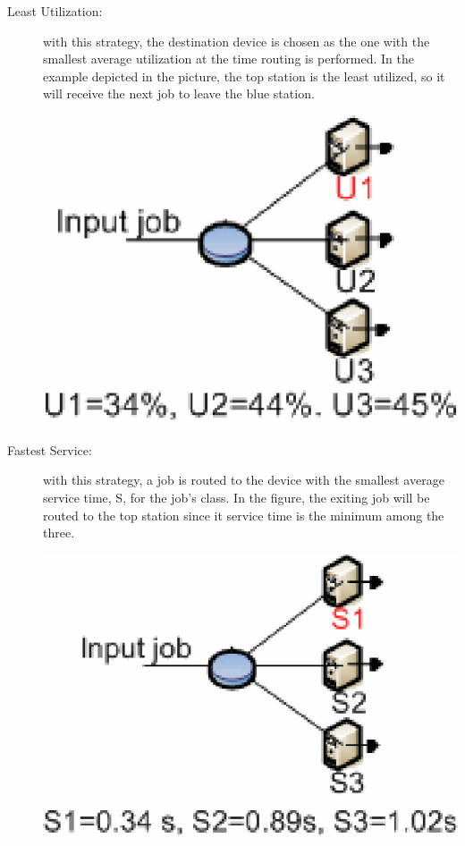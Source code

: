 \begin{description}
\begin{center}
\end{center}
\item[Least Utilization:] with this strategy, the destination device is chosen as the one with the smallest average utilization at the time routing is performed. In the example depicted in the picture, the top station is the least utilized, so it will receive the next job to leave the blue station.
\begin{center}
\includegraphics[scale=.5]{img/jsim/utilization.eps}
\end{center}
\item[Fastest Service:] with this strategy, a job is routed to the device with the smallest average service time, S, for the job's class. In the figure, the exiting job will be routed to the top station since it service time is the minimum among the three.
\begin{center}
\includegraphics[scale=.5]{img/jsim/S_time.eps}
\end{center}
\end{description}

